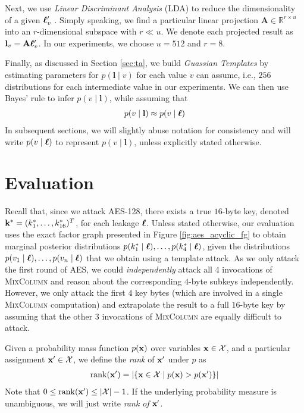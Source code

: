 Next, we use \emph{Linear Discriminant Analysis} (LDA) to reduce the dimensionality of a given $\boldsymbol{\ell}'_v$ \cite{lda}. Simply speaking, we find a particular linear projection $\mathbf{A} \in \mathbb{R}^{r \times u}$ into an $r$-dimensional subspace with $r \ll u$. We denote each projected result as $\mathbf{l}_v = \mathbf{A} \boldsymbol{\ell}'_v$. In our experiments, we choose $u=512$ and $r=8$.

Finally, as discussed in Section \ref{sec:ta}, we build \emph{Guassian Templates} by estimating parameters for $p(\mathbf{l} \mid v)$ for each value $v$ can assume, i.e., $256$ distributions for each intermediate value in our experiments. We can then use Bayes' rule to infer $p(v \mid \mathbf{l})$, while assuming that
\begin{align}
p(v \mid \mathbf{l}) \approx p(v \mid \boldsymbol{\ell})
\end{align}
In subsequent sections, we will slightly abuse notation for consistency and will write $p(v \mid \boldsymbol{\ell})$ to represent $p(v \mid \mathbf{l})$, unless explicitly stated otherwise.

\section{Evaluation}
\label{sec:eval}
Recall that, since we attack AES-128, there exists a true $16$-byte key, denoted $\mathbf{k}^* = (k^*_1,\dots,k^*_{16})^T$, for each leakage $\boldsymbol{\ell}$.
Unless stated otherwise, our evaluation uses the exact factor graph presented in Figure \ref{fig:aes_acyclic_fg} to obtain marginal posterior distributions $p(k^*_1 \mid \boldsymbol{\ell}),\dots,p(k^*_4 \mid \boldsymbol{\ell})$, given the distributions $p(v_1 \mid \boldsymbol{\ell}), \dots, p(v_n \mid \boldsymbol{\ell})$ that we obtain using a template attack.
As we only attack the first round of AES, we could \emph{independently} attack all $4$ invocations of \textsc{MixColumn} and reason about the corresponding $4$-byte subkeys independently. However, we only attack the first $4$ key bytes (which are involved in a single \textsc{MixColumn} computation) and extrapolate the result to a full $16$-byte key by assuming that the other $3$ invocations of \textsc{MixColumn} are equally difficult to attack.

\begin{definition}[Rank]
    Given a probability mass function $p(\mathbf{x})$ over variables $\mathbf{x} \in \mathcal{X}$, and a particular assignment $\mathbf{x}' \in \mathcal{X}$, we define the \emph{rank} of $\mathbf{x}'$ under $p$ as
    \begin{align}
        \operatorname{rank}(\mathbf{x}') = |\{ \mathbf{x} \in \mathcal{X} \mid p(\mathbf{x}) > p(\mathbf{x}') \}|
    \end{align}
    Note that $0 \leq \operatorname{rank}(\mathbf{x}') \leq |\mathcal{X}| - 1$. If the underlying probability measure is unambiguous, we will just write \emph{rank of} $\mathbf{x}'$.
\end{definition}

